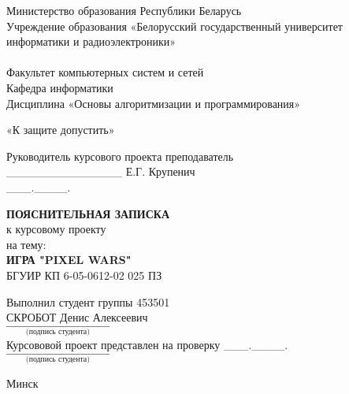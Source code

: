 \newpage
\thispagestyle{empty}

\begin{center}
    Министерство образования Республики Беларусь \\
    Учреждение образования «Белорусский государственный университет информатики и радиоэлектроники»
    \\~\\
    Факультет компьютерных систем и сетей \\
    Кафедра информатики \\
    Дисциплина «Основы алгоритмизации и программирования» \\
\end{center}

\vspace{2\baselineskip}

\hfill\begin{minipage}{0.45\textwidth}
    \centerline{«К защите допустить»}
    \raggedright
    Руководитель курсового проекта преподаватель \\
    \_\_\_\_\_\_\_\_\_\_\_\_\_\_ Е.Г. Крупенич \\
    \_\_\_.\_\_\_\_.\the\year{}
\end{minipage}

\vspace{2\baselineskip}

\begin{center}
    \uppercase{\textbf{Пояснительная записка}} \\
    к курсовому проекту \\
    на тему: \\
    \uppercase{\guillemetleft\textbf{Игра "Pixel Wars"}\guillemetright} \\
    \vspace{1\baselineskip}
    БГУИР КП 6-05-0612-02 025 ПЗ %
\end{center}

\vspace{2\baselineskip}

\hfill\begin{minipage}{0.45\textwidth}
    \raggedright
    Выполнил студент группы 453501 \\
    \uppercase{Скробот} Денис Алексеевич \\
    $\underset{\text{(подпись студента)}}{\_\_\_\_\_\_\_\_\_\_\_\_\_\_\_\_\_\_\_\_\_\_\_\_\_\_\_\_}$ \\
    \vspace{\baselineskip}
    Курсововой проект представлен на проверку \_\_\_.\_\_\_\_.\the\year{} \\
    $\underset{\text{(подпись студента)}}{\_\_\_\_\_\_\_\_\_\_\_\_\_\_\_\_\_\_\_\_\_\_\_\_\_\_\_\_}$
\end{minipage}

\vspace{\fill}

\centerline{Минск \the\year{}}